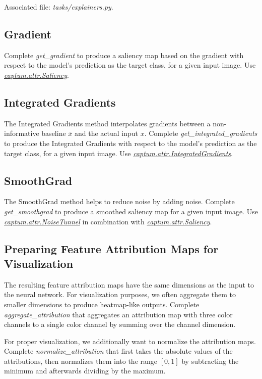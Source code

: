 \documentclass[a4paper]{article}
\begin{document}
\noindent Associated file: \textit{tasks/explainers.py}.

\subsection{Gradient}
Complete \textit{get\_gradient} to produce a saliency map based on the gradient with respect to the model's prediction as the target class, for a given input image.
Use \textit{\href{https://captum.ai/api/saliency.html}{captum.attr.Saliency}}.

\subsection{Integrated Gradients}
The Integrated Gradients method interpolates gradients between a non-informative baseline $\bar{x}$ and the actual input $x$.
Complete \textit{get\_integrated\_gradients} to produce the Integrated Gradients with respect to the model's prediction as the target class, for a given input image.
Use \textit{\href{https://captum.ai/api/integrated_gradients.html}{captum.attr.IntegratedGradients}}.

\subsection{SmoothGrad}
The SmoothGrad method helps to reduce noise by adding noise. 
Complete \textit{get\_smoothgrad} to produce a smoothed saliency map for a given input image.
Use \textit{\href{https://captum.ai/api/noise_tunnel.html}{captum.attr.NoiseTunnel}} in combination with \textit{\href{https://captum.ai/api/saliency.html}{captum.attr.Saliency}}.

\subsection{Preparing Feature Attribution Maps for Visualization}
The resulting feature attribution maps have the same dimensions as the input to the neural network.
For visualization purposes, we often aggregate them to smaller dimensions to produce heatmap-like outputs.
Complete \textit{aggregate\_attribution} that aggregates an attribution map with three color channels to a single color channel by summing over the channel dimension.

For proper visualization, we additionally want to normalize the attribution maps.
Complete \textit{normalize\_attribution} that first takes the absolute values of the attributions, then normalizes them into the range $[0, 1]$ by subtracting the minimum and afterwards dividing by the maximum.
\end{document}

